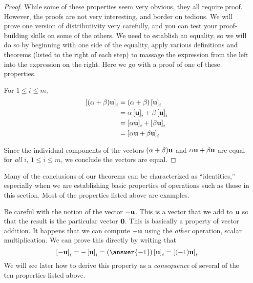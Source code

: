 \documentclass{ximera}
\begin{document}
\begin{theorem}
\begin{proof}
  While some of these properties seem very obvious, they all require
  proof.  However, the proofs are not very interesting, and border on
  tedious. We will prove one version of distributivity very carefully,
  and you can test your proof-building skills on some of the others.
  We need to establish an equality, so we will do so by beginning with
  one side of the equality, apply various definitions and theorems
  (listed to the right of each step) to massage the expression from
  the left into the expression on the right.  Here we go with a proof
  of one of these properties.

  For $1\leq i\leq m$,
  \begin{align*}
    \left\lbrack(\alpha+\beta)\mathbf{u}\right\rbrack_{i}
    &=(\alpha+\beta)\left\lbrack\mathbf{u}\right\rbrack_{i} \\
    &=\alpha\left\lbrack\mathbf{u}\right\rbrack_{i}+\beta\left\lbrack\mathbf{u}\right\rbrack_{i} \\
    &=\left\lbrack\alpha\mathbf{u}\right\rbrack_{i}+\left\lbrack\beta\mathbf{u}\right\rbrack_{i} \\
    &=\left\lbrack\alpha\mathbf{u}+\beta\mathbf{u}\right\rbrack_{i}
  \end{align*}

  Since the individual components of the vectors
  $(\alpha+\beta)\mathbf{u}$ and $\alpha\mathbf{u}+\beta\mathbf{u}$ are
  equal for \textit{all} $i$, $1\leq i\leq m$, we conclude the vectors
  are equal.
\end{proof}
\end{theorem}

Many of the conclusions of our theorems can be characterized as
``identities,'' especially when we are establishing basic properties
of operations such as those in this section.  Most of the properties
listed above are examples.

Be careful with the notion of the vector $\mathbf{-u}$.  This is a
vector that we add to $\mathbf{u}$ so that the result is the particular
vector $\mathbf{0}$.  This is basically a property of vector
addition.  It happens that we can compute $\mathbf{-u}$ using the
\textit{other} operation, scalar multiplication.  We can prove this
directly by writing that
\[
  \vectorentry{\vect{-u}}{i}
  =-\vectorentry{\vect{u}}{i}
  =(\answer{-1})\vectorentry{\vect{u}}{i}
  =\vectorentry{(-1)\vect{u}}{i}
\]
We will see later how to derive this property as a
\textit{consequence} of several of the ten properties listed above.
\end{document}
